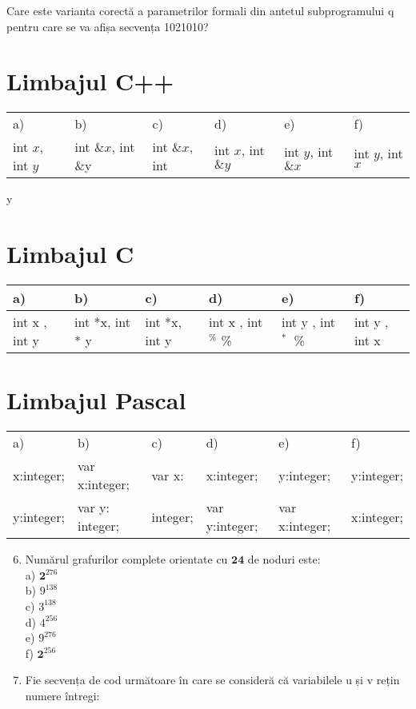 Care este varianta corectă a parametrilor formali din antetul subprogramului q pentru care se va afișa secvența 1021010?

\section*{Limbajul C++}
\begin{center}
\begin{tabular}{llllll}
a) & b) & c) & d) & e) & f) \\
int $x$, int $y$ & int $\& x$, int \&y & int $\& x$, int & int $x$, int $\& y$ & int $y$, int $\& x$ & int $y$, int $x$ \\
\end{tabular}
\end{center} y

\section*{Limbajul C}
\begin{center}
\begin{tabular}{|l|l|l|l|l|l|}
\hline
a) & b) & c) & d) & e) & f) \\
\hline
int x , int y & int *x, int * y & int *x, int y & int x , int ${ }^{\text {\% }}$ \% & int y , int ${ }^{\text {* }}$ \% & int y , int x \\
\hline
\end{tabular}
\end{center}

\section*{Limbajul Pascal}
\begin{center}
\begin{tabular}{llllll}
a) & b) & c) & d) & e) & f) \\
x:integer; & var x:integer; & var x: & x:integer; & y:integer; & y:integer; \\
y:integer; & var y: integer; & integer; & var y:integer; & var x:integer; & x:integer; \\
\end{tabular}
\end{center}

\begin{enumerate}
  \setcounter{enumi}{5}
  \item Numărul grafurilor complete orientate cu $\mathbf{2 4}$ de noduri este:\\
a) $\mathbf{2}^{276}$\\
b) $9^{138}$\\
c) $3^{138}$\\
d) $4^{256}$\\
e) $9^{276}$\\
f) $\mathbf{2}^{256}$
  \item Fie secvența de cod următoare în care se consideră că variabilele u și v rețin numere întregi:
\end{enumerate}

